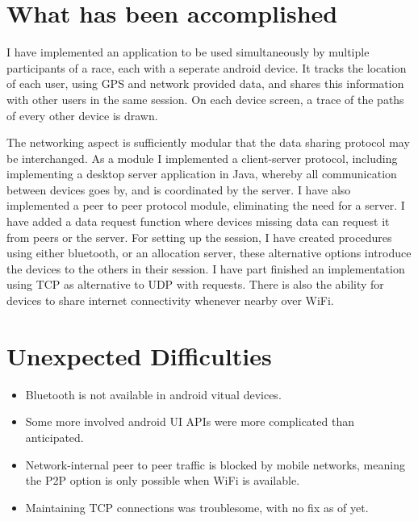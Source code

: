 \documentclass{article}
\begin{document}
\section*{What has been accomplished}

I have implemented an application to be used simultaneously by multiple participants of a race, each with a seperate android device. It tracks the location of each user, using GPS and network provided data, and shares this information with other users in the same session. On each device screen, a trace of the paths of every other device is drawn.

The networking aspect is sufficiently modular that the data sharing protocol may be interchanged. As a module I implemented a client-server protocol, including implementing a desktop server application in Java, whereby all communication between devices goes by, and is coordinated by the server.
I have also implemented a peer to peer protocol module, eliminating the need for a server.
I have added a data request function where devices missing data can request it from peers or the server.
For setting up the session, I have created procedures using either bluetooth, or an allocation server, these alternative options introduce the devices to the others in their session.
I have part finished an implementation using TCP as alternative to UDP with requests.
There is also the ability for devices to share internet connectivity whenever nearby over WiFi.

\section*{Unexpected Difficulties}
\begin{itemize}
\item{Bluetooth is not available in android vitual devices.}
\item{Some more involved android UI APIs were more complicated than anticipated.}
\item{Network-internal peer to peer traffic is blocked by mobile networks, meaning the P2P option is only possible when WiFi is available.}
\item{Maintaining TCP connections was troublesome, with no fix as of yet.}
\end{itemize}
\end{document}
